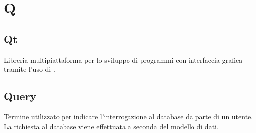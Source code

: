 \section*{Q}
\markright{}
\subsection*{Qt}
Libreria multipiattaforma per lo sviluppo di programmi con interfaccia grafica tramite l'uso di .
\subsection*{Query} 
Termine utilizzato per indicare l'interrogazione al database da parte di un utente. La richiesta al database viene effettuata a seconda del modello di dati.